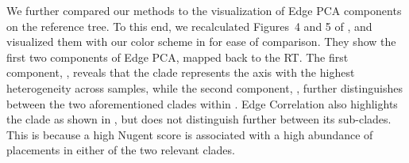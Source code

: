 We further compared our methods to the visualization of Edge PCA components on the reference tree.
To this end, we recalculated Figures~4 and 5 of \cite{Matsen2011a},
and visualized them with our color scheme in  for ease of comparison.
They show the first two components of Edge PCA, mapped back to the \ac{RT}.
The first component, ,
reveals that the  clade represents the axis with the highest heterogeneity across samples,
while the second component, ,
further distinguishes between the two aforementioned clades within .
Edge Correlation also highlights the  clade as shown in ,
but does not distinguish further between its sub-clades.
This is because a high Nugent score is associated
with a high abundance of placements in either of the two relevant  clades.


